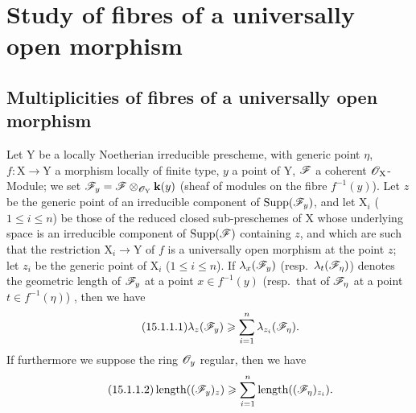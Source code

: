 \section{Study of fibres of a universally open morphism}
\label{section:IV.15}

\subsection{Multiplicities of fibres of a universally open morphism}
\label{subsection:IV.15.1}

\begin{proposition}[15.1.1]
\label{IV.15.1.1}
Let $\mathrm{Y}$ be a locally Noetherian irreducible prescheme, with generic point $\eta$, $f:\mathrm{X}\to\mathrm{Y}$ a morphism locally of finite type, $y$ a point of $\mathrm{Y}$, $\mathscr{F}$ a coherent $\mathscr{O}_\mathrm{X}$-Module;
we set $\mathscr{F}_y=\mathscr{F}\otimes_{\mathscr{O}_\mathrm{Y}}\mathbf{k}(y)$ (sheaf of modules on the fibre $f^{-1}(y)$).
Let $z$ be the generic point of an irreducible component of $\operatorname{Supp}(\mathscr{F}_y)$, and let $\mathrm{X}_i$ ($1\leqslant i\leqslant n$) be those of the reduced closed sub-preschemes of $\mathrm{X}$ whose underlying space is an irreducible component of $\operatorname{Supp}(\mathscr{F})$ containing $z$, and which are such that the restriction $\mathrm{X}_i\to\mathrm{Y}$ of $f$ is a universally open morphism at the point $z$; let $z_i$ be the generic point of $\mathrm{X}_i$ ($1\leqslant i\leqslant n$).
If $\lambda_x(\mathscr{F}_y)$ (resp.~$\lambda_t(\mathscr{F}_\eta)$) denotes the geometric length of $\mathscr{F}_y$ at a point $x\in f^{-1}(y)$ (resp.~that of $\mathscr{F}_\eta$ at a point $t\in f^{-1}(\eta)$) , then we have
\[
\tag{15.1.1.1}
\label{IV.15.1.1.1}
  \lambda_z(\mathscr{F}_y)\geqslant\sum_{i=1}^{n}\lambda_{z_i}(\mathscr{F}_\eta).
\]
If furthermore we suppose the ring $\mathscr{O}_y$ regular, then we have
\[
\tag{15.1.1.2}
\label{IV.15.1.1.2}
  \operatorname{length}((\mathscr{F}_y)_z)\geqslant\sum_{i=1}^{n}\operatorname{length}((\mathscr{F}_\eta)_{z_i}).
\]
\end{proposition}

